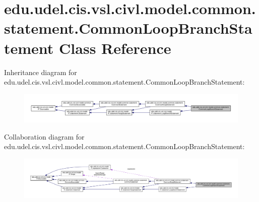 \hypertarget{classedu_1_1udel_1_1cis_1_1vsl_1_1civl_1_1model_1_1common_1_1statement_1_1CommonLoopBranchStatement}{}\section{edu.\+udel.\+cis.\+vsl.\+civl.\+model.\+common.\+statement.\+Common\+Loop\+Branch\+Statement Class Reference}
\label{classedu_1_1udel_1_1cis_1_1vsl_1_1civl_1_1model_1_1common_1_1statement_1_1CommonLoopBranchStatement}


Inheritance diagram for edu.\+udel.\+cis.\+vsl.\+civl.\+model.\+common.\+statement.\+Common\+Loop\+Branch\+Statement\+:
\nopagebreak
\begin{figure}[H]
\begin{center}
\leavevmode
\includegraphics[width=350pt]{classedu_1_1udel_1_1cis_1_1vsl_1_1civl_1_1model_1_1common_1_1statement_1_1CommonLoopBranchStatement__inherit__graph}
\end{center}
\end{figure}


Collaboration diagram for edu.\+udel.\+cis.\+vsl.\+civl.\+model.\+common.\+statement.\+Common\+Loop\+Branch\+Statement\+:
\nopagebreak
\begin{figure}[H]
\begin{center}
\leavevmode
\includegraphics[width=350pt]{classedu_1_1udel_1_1cis_1_1vsl_1_1civl_1_1model_1_1common_1_1statement_1_1CommonLoopBranchStatement__coll__graph}
\end{center}
\end{figure}
